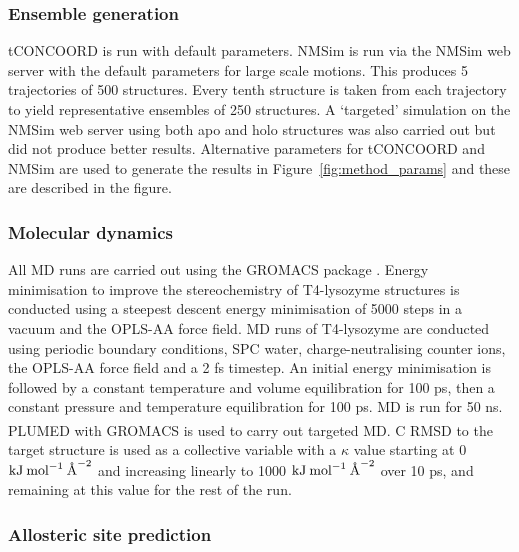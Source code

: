 \subsubsection{Ensemble generation}

tCONCOORD \cite{Seeliger2007} is run with default parameters.
NMSim is run via the NMSim web server \cite{Kruger2012} with the default parameters for large scale motions.
This produces 5 trajectories of 500 structures. Every tenth structure is taken from each trajectory to yield representative ensembles of 250 structures.
A `targeted' simulation on the NMSim web server using both apo and holo structures was also carried out but did not produce better results.
Alternative parameters for tCONCOORD and NMSim are used to generate the results in Figure~\ref{fig:method_params} and these are described in the figure.


\subsubsection{Molecular dynamics}

All MD runs are carried out using the GROMACS package \cite{Abraham2015}.
Energy minimisation to improve the stereochemistry of T4-lysozyme structures is conducted using a steepest descent energy minimisation of 5000 steps in a vacuum and the OPLS-AA force field.
MD runs of T4-lysozyme are conducted using periodic boundary conditions, SPC water, charge-neutralising counter ions, the OPLS-AA force field and a 2 fs timestep.
An initial energy minimisation is followed by a constant temperature and volume equilibration for 100 ps, then a constant pressure and temperature equilibration for 100 ps.
MD is run for 50 ns.
PLUMED \cite{Tribello2014} with GROMACS is used to carry out targeted MD.
C\textsuperscript{\textalpha} RMSD to the target structure is used as a collective variable with a $\kappa$ value starting at 0 $\textup{kJ} \: \textup{mol}^{-1} \: \textup{\AA}^{-2}$ and increasing linearly to 1000 $\textup{kJ} \: \textup{mol}^{-1} \: \textup{\AA}^{-2}$ over 10 ps, and remaining at this value for the rest of the run.


\subsubsection{Allosteric site prediction}

